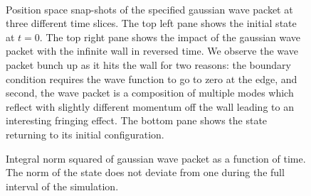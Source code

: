 \documentclass[singlepage,notitlepage,nofootinbib,11pt]{revtex4-1}
\begin{document}
\begin{figure}[h]
  \centering
  \captionsetup[subfigure]{labelformat=empty}
  \\
  \caption{\label{evolution} Position space snap-shots of the specified gaussian wave packet at three different time slices. The top left pane shows the initial state at $t=0$. The top right pane shows the impact of the gaussian wave packet with the infinite wall in reversed time. We observe the wave packet bunch up as it hits the wall for two reasons: the boundary condition requires the wave function to go to zero at the edge, and second, the wave packet is a composition of multiple modes which reflect with slightly different momentum off the wall leading to an interesting fringing effect. The bottom pane shows the state returning to its initial configuration.}
\end{figure}
\begin{figure}[h]
  \centering
  \captionsetup[subfigure]{labelformat=empty}
  \caption{\label{unitarity} Integral norm squared of gaussian wave packet as a function of time. The norm of the state does not deviate from one during the full interval of the simulation.}
\end{figure}
\clearpage
\end{document}
